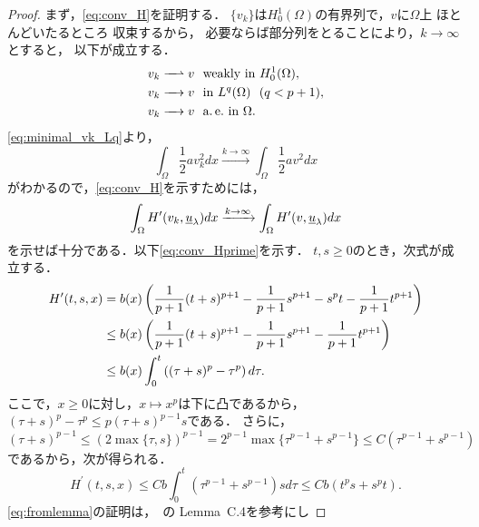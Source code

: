 \begin{proof}
 まず，\eqref{eq:conv_H}を証明する．
 $\{ v_k \}$は$H_0^1(\Omega)$の有界列で，$v$に$\Omega$上
 ほとんどいたるところ
 収束するから，
 必要ならば部分列をとることにより，$k \to \infty$とすると，
 以下が成立する．
 \begin{align}
  v_k \xrightharpoonup{ \mbox{ ~ } } v & \ \ \text{weakly~} \tin
  H_0^1(\Omega), \label{eq:minimal_vk_weakly} \\
  v_k \xrightarrow{ \mbox{ ~ } } v & \ \ \tin L^q(\Omega) \ \
   (q < p+1), \label{eq:minimal_vk_Lq} \\
  v_k \xrightarrow{ \mbox{ ~ } } v & \ \ \ae \tin \Omega. 
    \label{eq:minimal_vk_ae}
 \end{align}
 \eqref{eq:minimal_vk_Lq}より，
 \[
  \int_\Omega \frac{1}{2} a v_k^2 dx \xrightarrow{k \to \infty}
 \int_\Omega \frac{1}{2}av^2 dx
 \]
 がわかるので，\eqref{eq:conv_H}を示すためには，
 \begin{equation}
  \int_\Omega H^\prime(v_k, \underline{u}_\lambda)dx \xrightarrow{ k \to \infty } 
  \int_\Omega H^\prime(v, \underline{u}_\lambda)dx \label{eq:conv_Hprime} \\  
 \end{equation}
 を示せば十分である．以下\eqref{eq:conv_Hprime}を示す．
 $t, s \geq 0$のとき，次式が成立する．
 \begin{align}
  H^\prime(t, s, x) &= b(x) \left( \frac{1}{p+1}(t+s)^{p+1} -
  \frac{1}{p+1} s^{p+1} - s^p t - \frac{1}{p+1} t^{p+1} \right) \notag \\
  & \leq b(x) \left( \frac{1}{p+1}(t+s)^{p+1} - \frac{1}{p+1}s^{p+1} -
  \frac{1}{p+1} t^{p+1}\right) \notag \\
  & \leq b(x) \int_0^t \left( (\tau + s)^p - \tau^p \right)
  d\tau. \label{eq:dtau} 
 \end{align}
 ここで，$x \geq 0$に対し，$x \mapsto x^p$は下に凸であるから，
 $(\tau + s)^p - \tau^p \leq p(\tau + s)^{p-1} s$である．
 さらに，
 \begin{equation}
  (\tau + s)^{p-1} \leq (2 \max\{\tau , s\})^{p-1} = 2^{p-1} \max \{
   \tau^{p-1} + s^{p-1} \} \leq C (\tau^{p-1} + s^{p-1}) \label{eq:taus2p-1}
 \end{equation}
 であるから，次が得られる．
 \begin{equation}
  H^\prime(t, s, x) \leq C b \int_0^t (\tau^{p-1} + s^{p-1}) s d \tau
   \leq C b ( t^{p} s + s^{p} t). \label{eq:fromlemma}
 \end{equation}
 \eqref{eq:fromlemma}の証明は，\cite{MR2317491}~の Lemma~C.4を参考にし

\end{proof}
